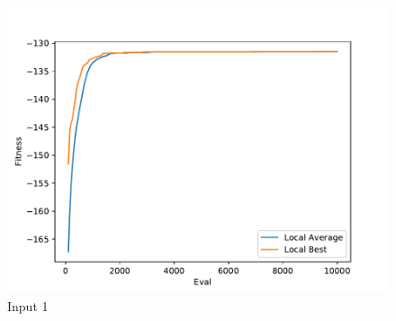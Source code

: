 \documentclass{standalone}
\begin{document}
\begin{figure}[!htb]
	\caption{Input 1}
	\label{fig:graph_1067}
	\includegraphics[width=\textwidth]{../graphs/graphs/1067.pdf}
\end{figure}
\end{document}
